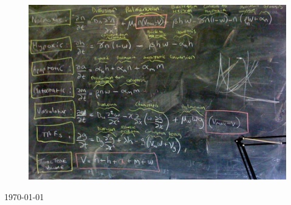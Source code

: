 \begin{titlepage}
\begin{center}
\vfill
\begin{figure}[htb]
\centering
  \includegraphics[width=160mm]{pics/Jan29twitte_model}
\end{figure}



\vfill

{\large \today \\}

\end{center}
\end{titlepage}